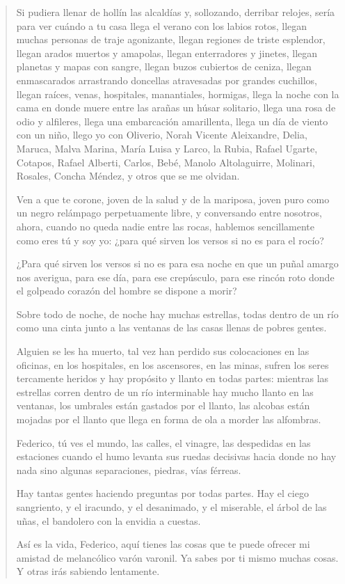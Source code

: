 \documentclass[12pt]{article}
\begin{document}
\begin{verse}
Si pudiera llenar de hollín las alcaldías  
y, sollozando, derribar relojes,  
sería para ver cuándo a tu casa  
llega el verano con los labios rotos,  
llegan muchas personas de traje agonizante,  
llegan regiones de triste esplendor,  
llegan arados muertos y amapolas,  
llegan enterradores y jinetes,  
llegan planetas y mapas con sangre,  
llegan buzos cubiertos de ceniza,  
llegan enmascarados arrastrando doncellas  
atravesadas por grandes cuchillos,  
llegan raíces, venas, hospitales,  
manantiales, hormigas,  
llega la noche con la cama en donde  
muere entre las arañas un húsar solitario,  
llega una rosa de odio y alfileres,  
llega una embarcación amarillenta,  
llega un día de viento con un niño,  
llego yo con Oliverio, Norah  
Vicente Aleixandre, Delia,  
Maruca, Malva Marina, María Luisa y Larco,  
la Rubia, Rafael Ugarte,  
Cotapos, Rafael Alberti,  
Carlos, Bebé, Manolo Altolaguirre,  
Molinari,  
Rosales, Concha Méndez,  
y otros que se me olvidan.  
	
Ven a que te corone, joven de la salud  
y de la mariposa, joven puro  
como un negro relámpago perpetuamente libre,  
y conversando entre nosotros,  
ahora, cuando no queda nadie entre las rocas,  
hablemos sencillamente como eres tú y soy yo:  
¿para qué sirven los versos si no es para el rocío?  
	
¿Para qué sirven los versos si no es para esa noche  
en que un puñal amargo nos averigua, para ese día,  
para ese crepúsculo, para ese rincón roto  
donde el golpeado corazón del hombre se dispone a morir?  
	
Sobre todo de noche,  
de noche hay muchas estrellas,  
todas dentro de un río  
como una cinta junto a las ventanas  
de las casas llenas de pobres gentes.  
	
Alguien se les ha muerto, tal vez  
han perdido sus colocaciones en las oficinas,  
en los hospitales, en los ascensores,  
en las minas,  
sufren los seres tercamente heridos  
y hay propósito y llanto en todas partes:  
mientras las estrellas corren dentro de un río interminable  
hay mucho llanto en las ventanas,  
los umbrales están gastados por el llanto,  
las alcobas están mojadas por el llanto  
que llega en forma de ola a morder las alfombras.  
	
Federico,  
tú ves el mundo, las calles,  
el vinagre,  
las despedidas en las estaciones  
cuando el humo levanta sus ruedas decisivas  
hacia donde no hay nada sino algunas  
separaciones, piedras, vías férreas.  
	
Hay tantas gentes haciendo preguntas  
por todas partes.  
Hay el ciego sangriento, y el iracundo, y el  
desanimado,  
y el miserable, el árbol de las uñas,  
el bandolero con la envidia a cuestas.  
	
Así es la vida, Federico, aquí tienes  
las cosas que te puede ofrecer mi amistad  
de melancólico varón varonil.  
Ya sabes por ti mismo muchas cosas.  
Y otras irás sabiendo lentamente.  

\end{verse}
\end{document}
